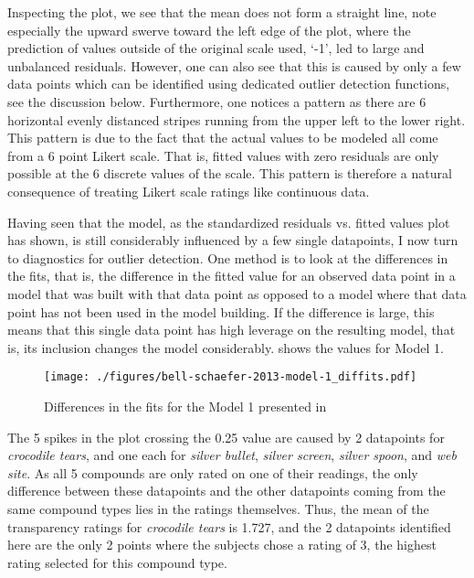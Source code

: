 Inspecting the plot, we see that the mean does not form a straight
line, note especially the upward swerve toward the left edge of the
plot, where the prediction of values outside of the original scale
used, `-1', led to large and unbalanced residuals. However, one can
also see that this is caused by only a few data points which can
be identified using dedicated outlier detection functions, see
the discussion below. Furthermore, one notices a pattern as
there are 6 horizontal evenly distanced stripes running from the upper
left to the lower right. This pattern is due to the fact
that the actual values to be modeled all come from a 6 point Likert
scale. That is, fitted values with zero residuals are only possible at
the 6 discrete values of the scale. This pattern is therefore a
natural consequence of treating Likert scale ratings like continuous
data. 

Having seen that the model, as the standardized
residuals vs. fitted values plot has shown,  is still considerably
influenced by a few single datapoints, I now turn to
diagnostics for outlier detection. One method is to look at the differences in the fits, that is, the
difference in the fitted value for an observed data point in a model
that was built with that data point as opposed to a model where that
data point has not been used in the model building. If the difference
is large, this means that this single data point has high leverage on
the resulting model, that is, its inclusion changes the model
considerably.  shows the values for Model 1.

\begin{figure}[!htb]
  \centering
\texttt{[image: ./figures/bell-schaefer-2013-model-1\_diffits.pdf]}
  
  \caption{Differences in the fits for the 
    Model 1 presented in \citet{BellandSchaefer:2013}}
  \label{fig:diffits}
\end{figure}


The 5 spikes in the plot crossing the 0.25 value are caused by 2 datapoints for
\emph{crocodile tears}, and one each for \emph{silver bullet},
\emph{silver screen}, \emph{silver spoon}, and \emph{web site}. As
all 5 compounds are only rated on one of their readings, the only
difference between these datapoints and the other datapoints coming
from the same compound types lies in the
ratings themselves. Thus, the mean of the transparency ratings for
\emph{crocodile tears} is 1.727, %
and the 2 datapoints identified here
are the only 2 points where the subjects chose a rating of 3, the
highest rating selected for this compound type.

